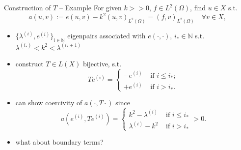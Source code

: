 \documentclass[11pt,aspectratio=169,xcolor=dvipsnames]{beamer}
\newcommand{\lami}{\lambda^{(i)}}
\newcommand{\ei}{e^{(i)}}
\newcommand{\nicearrow}[2]{\raisebox{#2}{\resizebox{0.45cm}{!}{\color{#1}{\MVRightArrow}\color{black}}}}
\begin{document}
\begin{frame}{Construction of $T$ -- Example}
  For given $k >\!\!> 0$, $f \in L^2(\Omega)$, find $u \in X$ s.t. 
  \begin{equation}\label{eq:HelmholtzAbstract}
    a(u,v) := e(u,v) - k^2(u,v)_{L^2(\Omega)} = (f,v)_{L^2(\Omega)} \quad \forall v \in X, \tag{P}
  \end{equation}
  \begin{itemize}
    \item<2->[\nicearrow{GOE}{-0.07cm}] $\{ \lami, \ei \}_{i \in \mathbb{N}}$ eigenpairs associated with $e(\cdot,\cdot)$, $i_{\ast} \in \mathbb{N}$ s.t. $\lambda^{(i_{\ast})} < k^2 < \lambda^{(i_{\ast} + 1)}$
    \item<3->[\nicearrow{GOE}{-0.07cm}] construct $T \in L(X)$ bijective, s.t. 
    \begin{equation*}
      T \ei = \begin{cases}
        - \ei &\text{ if } i \le i_{\ast}; \\
        + \ei &\text{ if } i > i_{\ast}.
      \end{cases}
    \end{equation*}
    \item<4->[\nicearrow{GOE}{-0.07cm}] can show coercivity of $a(\cdot,T \cdot)$ since 
    \begin{equation*}
      a(\ei,T \ei) = \begin{cases}
        k^2 - \lami &\text{ if } i \le i_{\ast} \\
        \lami - k^2 &\text{ if } i > i_{\ast}
      \end{cases} > 0.
    \end{equation*}
    \item<5->[\nicearrow{GOE}{-0.07cm}] what about boundary terms?
  \end{itemize}
\end{frame}
\end{document}

